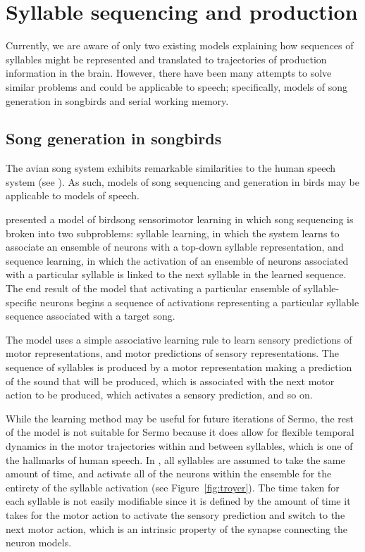 \section{Syllable sequencing and production}

Currently,
we are aware of only two existing models
explaining how sequences of syllables
might be represented
and translated to trajectories of
production information in the brain.
However, there have been many attempts
to solve similar problems
and could be applicable to speech;
specifically,
models of song generation in songbirds
and serial working memory.

\subsection{Song generation in songbirds}

The avian song system
exhibits remarkable similarities
to the human speech system
(see \cite{bolhuis2010}).
As such, models of song sequencing
and generation in birds
may be applicable to models of speech.

\cite{troyer2000} presented a model
of birdsong sensorimotor learning
in which song sequencing is broken
into two subproblems:
syllable learning,
in which the system learns
to associate an ensemble of neurons
with a top-down syllable representation,
and sequence learning,
in which the activation
of an ensemble of neurons
associated with a particular syllable
is linked to the next syllable
in the learned sequence.
The end result of the model
that activating a particular
ensemble of syllable-specific neurons
begins a sequence of activations
representing a particular syllable sequence
associated with a target song.

The model uses a
simple associative learning rule
to learn sensory predictions
of motor representations,
and motor predictions
of sensory representations.
The sequence of syllables is produced
by a motor representation
making a prediction of the
sound that will be produced,
which is associated with
the next motor action to be produced,
which activates a sensory prediction,
and so on.


While the learning method
may be useful for future iterations of Sermo,
the rest of the model is not suitable for Sermo
because it does allow for
flexible temporal dynamics
in the motor trajectories within and between syllables,
which is one of the hallmarks of human speech.
In \cite{troyer2000},
all syllables are assumed
to take the same amount of time,
and activate all of the neurons
within the ensemble for the entirety
of the syllable activation
(see Figure~\ref{fig:troyer}).
The time taken for each syllable
is not easily modifiable since
it is defined by the amount of time
it takes for the motor action
to activate the sensory prediction
and switch to the next motor action,
which is an intrinsic property
of the synapse connecting the neuron models.

